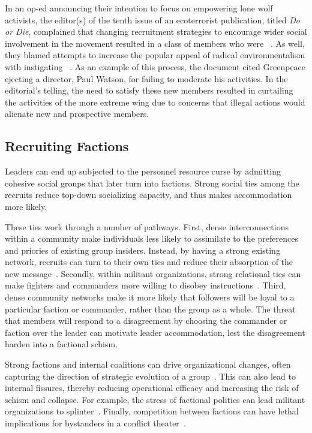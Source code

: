In an op-ed announcing their intention to focus on empowering lone wolf activists, the editor(s) of the tenth issue of an ecoterrorist publication, titled \textit{Do or Die}, complained that changing recruitment strategies to encourage wider social involvement in the movement resulted in a class of members who were ~\autocite[3]{doordie2003rise}.  As well, they blamed attempts to increase the popular appeal of radical
environmentalism with instigating ~\autocite[3]{doordie2003rise}. As an example of this process,
the document cited Greenpeace ejecting a director, Paul Watson, for
failing to moderate his activities.  In the editorial's telling, the
need to satisfy these new members resulted in curtailing the
activities of the more extreme wing due to concerns that illegal
actions would alienate new and prospective members.  

\subsection{Recruiting Factions}
Leaders can end up subjected to the personnel resource curse by admitting cohesive social groups that later turn into factions. Strong social ties among the recruits reduce top-down socializing capacity, and thus makes accommodation more likely. 

These ties work through a number of pathways. First, dense interconnections within a community make individuals less likely to assimilate to the  preferences and priories of existing group insiders. Instead, by having a strong existing network, recruits can turn to their own ties and reduce their absorption of the new message~\autocite{morrison2002newcomers}.  Secondly, within militant organizations, strong relational ties can make fighters and commanders more willing to disobey instructions~\autocite{hundman2019rogues}. Third, dense community networks make it more likely that followers will be loyal to a particular faction or commander, rather than the group as a whole. The threat that members will respond to a disagreement by choosing the commander or faction over the leader can motivate leader accommodation, lest the disagreement harden into a factional schism.

Strong factions and internal coalitions can drive organizational changes, often capturing the direction of strategic evolution of a group~\autocite{cyert1963behavioral, march1958organizations, harmel1994integrated,bacharach1980power,pfeffer1981power, bettcher2005factions, gray1985politics}. This can also lead to internal fissures, thereby reducing operational efficacy and increasing the risk of schism and collapse. For example, the stress of factional politics can lead militant organizations to splinter~\autocite{pearlman2012nonstate, bakke2012plague}. Finally, competition between factions can have lethal implications for bystanders in a conflict theater~\autocite{de2008terrorist, bloom2004palestinian}.

